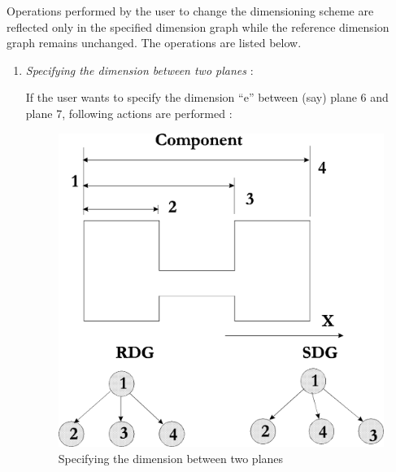 		Operations performed by the user to change the dimensioning scheme
		are reflected only in the specified dimension graph while the reference
		dimension graph remains unchanged. 
		The operations are listed below.
     
 
        
		\begin{enumerate}
		\item
					{\em Specifying the dimension between two planes} :

                    If the user wants to specify the dimension ``e'' between 
                    (say) plane 6 and plane 7, following actions are performed :
 
        
        \begin{figure}[htbp]
                               \hspace{4cm}
            \includegraphics[scale=0.43]{DEFDIM.png}
            \caption{Specifying the dimension between two planes}
            \label{ex1dim2}
        \end{figure}



\end{enumerate}
